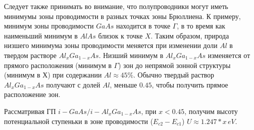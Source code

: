 Следует также принимать во внимание, что полупроводники могут иметь минимумы зоны проводимости в разных точках зоны Брюллиена. К примеру, минимум зоны проводимости $GaAs$ находится в точке $\Gamma$, в то время как наименьший минимум в $AlAs$ близок к точке $X$. Таким образом, природа низшего минимума зоны проводимости меняется при изменении доли $Al$ в твердом растворе $Al_{x}Ga_{1−x}As$. Низший минимум в $Al_{x}Ga_{1−x}As$ изменяется от прямого расположения (минимум в $\Gamma$) зон до непрямой зонной структуры (минимум в $Х$) при содержании $Al \approx 45\%$. Обычно твердый раствор $Al_{x}Ga_{1−x}As$ получают с долей $Al$, меньше $0.45$, чтобы получить прямое расположение зон.

Рассматривая ГП $i\!-\!GaAs/i\!-\!Al_{x}Ga_{1−x}As$, при $x < 0.45$, получим высоту потенциальной ступеньки в зоне проводимости ($E_{c2} - E_{c1}$) $U \approx 1.247*x\, eV$.

